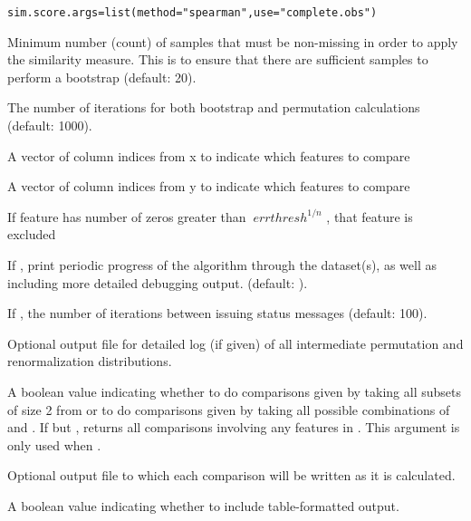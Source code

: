 \documentclass{article}\usepackage[]{graphicx}\usepackage[usenames,dvipsnames]{color}
\newcommand{\hlstr}[1]{\textcolor[rgb]{0.251,0.627,0.251}{#1}}%
\newcommand{\hlstd}[1]{\textcolor[rgb]{0.251,0.251,0.251}{#1}}%
\newcommand{\hlkwb}[1]{\textcolor[rgb]{0,0,0}{#1}}%
\newcommand{\hlkwc}[1]{\textcolor[rgb]{0.251,0.251,0.251}{#1}}%
\newcommand{\hlkwd}[1]{\textcolor[rgb]{0.878,0.439,0.125}{#1}}%
\newenvironment{knitrout}{}{} %
\begin{document}
\begin{description}
\begin{knitrout}
\color{fgcolor}\begin{kframe}
\begin{alltt}
\hlstd{sim.score.args} \hlkwb{=} \hlkwd{list}\hlstd{(}\hlkwc{method}\hlstd{=}\hlstr{"spearman"}\hlstd{,} \hlkwc{use}\hlstd{=}\hlstr{"complete.obs"}\hlstd{)}
\end{alltt}
\end{kframe}
\end{knitrout}

\item[\Rcode{min.subj}]
Minimum number (count) of samples that must be non-missing in order to apply the similarity measure.  This is to ensure that there are sufficient samples to perform a bootstrap (default: 20).

\item[\Rcode{iterations}]
The number of iterations for both bootstrap and permutation calculations (default: 1000).

\item[\Rcode{subset.cols.x}]
A vector of column indices from x to indicate which features to compare

\item[\Rcode{subset.cols.y}]
A vector of column indices from y to indicate which features to compare

\item[\Rcode{errthresh}]
If feature has number of zeros greater than   $\ errthresh^{1/n} $  , that feature is excluded     

\item[\Rcode{verbose}]
If , print periodic progress of the algorithm through the dataset(s), as well as including more detailed debugging output.  (default: ).

\item[\Rcode{iterations.gap}]
If , the number of iterations between issuing status messages (default: 100).

\item[\Rcode{distributions}]
Optional output file for detailed log (if given) of all intermediate permutation and renormalization distributions.

\item[\Rcode{compare.within.x}]
  A boolean value indicating whether to do comparisons given by taking all subsets of size 2 from  or to do comparisons given by taking all possible combinations of  and .  If  but , returns all comparisons involving any features in .  This argument is only used when .
  
\item[\Rcode{concurrent.output}]
    Optional output file to which each comparison will be written as it is calculated.
    
\item[\Rcode{make.output.table}]
      A boolean value indicating whether to include table-formatted output.

\end{description}
\end{document}
